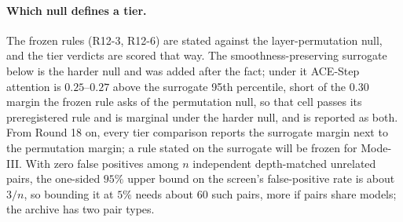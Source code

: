 \documentclass[11pt]{article}
\begin{document}
\paragraph{Which null defines a tier.} The frozen rules (R12-3, R12-6) are stated against the layer-permutation null, and the tier verdicts are scored that way. The smoothness-preserving surrogate below is the harder null and was added after the fact; under it ACE-Step attention is $0.25$--$0.27$ above the surrogate 95th percentile, short of the $0.30$ margin the frozen rule asks of the permutation null, so that cell passes its preregistered rule and is marginal under the harder null, and is reported as both. From Round 18 on, every tier comparison reports the surrogate margin next to the permutation margin; a rule stated on the surrogate will be frozen for Mode-III. With zero false positives among $n$ independent depth-matched unrelated pairs, the one-sided $95\%$ upper bound on the screen's false-positive rate is about $3/n$, so bounding it at $5\%$ needs about $60$ such pairs, more if pairs share models; the archive has two pair types.
\end{document}
